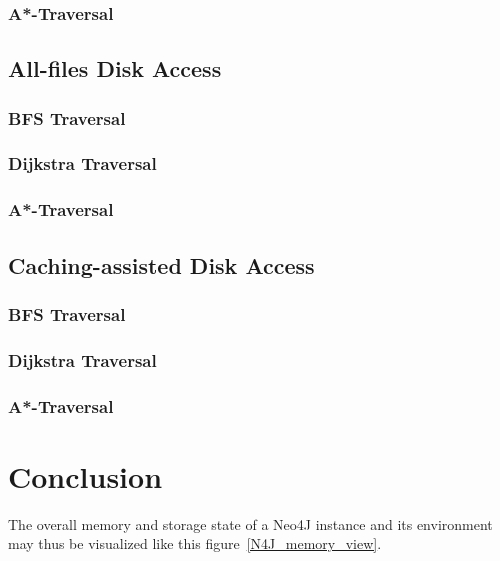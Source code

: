 \documentclass[a4paper,10pt]{article}
\begin{document}
    \subsubsection{A*-Traversal}

\subsection{All-files Disk Access}
 \subsubsection{BFS Traversal}

    \subsubsection{Dijkstra Traversal}

    \subsubsection{A*-Traversal}

\subsection{Caching-assisted Disk Access}
 \subsubsection{BFS Traversal}

    \subsubsection{Dijkstra Traversal}

    \subsubsection{A*-Traversal}


\section{Conclusion}
The overall memory and storage state of a Neo4J instance and its environment may thus be visualized like this figure~\ref{N4J_memory_view}.
\end{document}
